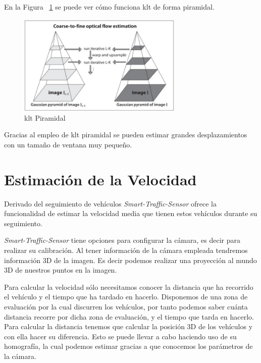En la Figura ~\ref{fig.klt_piramidal} se puede ver cómo funciona \acrshort{klt} de forma piramidal.

 \begin{figure}[H] 
\begin{center}
	\includegraphics[width=0.7\textwidth]{figures/Diseno_global/klt_piramidal.png}
   \caption{\acrshort{klt} Piramidal}
	\label{fig.klt_piramidal}
\end{center}
\end{figure}

Gracias al empleo de \acrshort{klt} piramidal se pueden estimar grandes desplazamientos con un tamaño de ventana muy pequeño.


\section{Estimación de la Velocidad}

Derivado del seguimiento de vehículos \textit{Smart-Traffic-Sensor} ofrece la funcionalidad de estimar la velocidad media que tienen estos vehículos durante su seguimiento.

\textit{Smart-Traffic-Sensor} tiene opciones para configurar la cámara, es decir para realizar su calibración. Al tener información de la cámara empleada tendremos información 3D de la imagen. Es decir podemos realizar una proyección al mundo 3D de nuestros puntos en la imagen.

Para calcular la velocidad sólo necesitamos conocer la distancia que ha recorrido el vehículo y el tiempo que ha tardado en hacerlo. Disponemos de una zona de evaluación por la cual discurren los vehículos, por tanto podemos saber cuánta distancia recorre por dicha zona de evaluación, y el tiempo que tarda en hacerlo. Para calcular la distancia tenemos que calcular la posición 3D de los vehículos y con ella hacer su diferencia. Esto se puede llevar a cabo haciendo uso de su homografía, la cual podemos estimar gracias a que conocemos los parámetros de la cámara.

